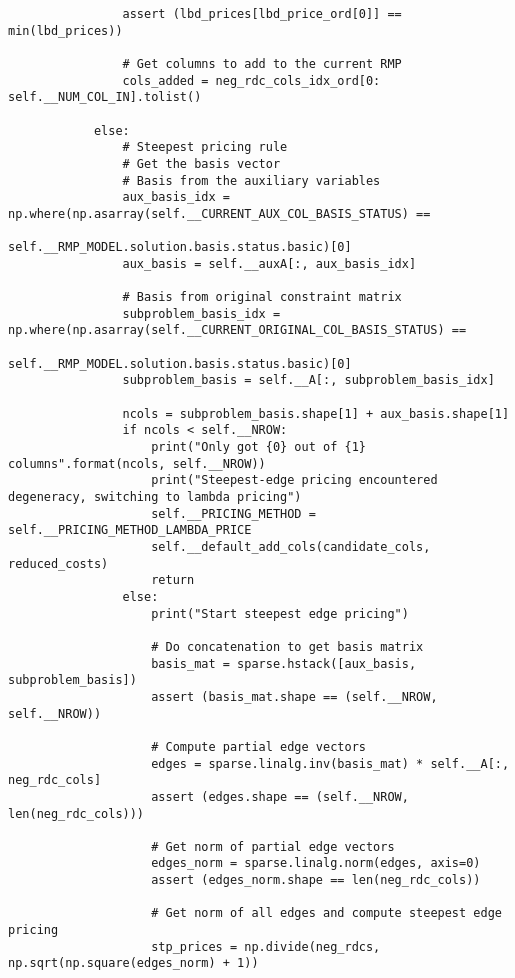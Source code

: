\documentclass{article}
\begin{document}
\begin{lstlisting}
                assert (lbd_prices[lbd_price_ord[0]] == min(lbd_prices))

                # Get columns to add to the current RMP
                cols_added = neg_rdc_cols_idx_ord[0: self.__NUM_COL_IN].tolist()

            else:
                # Steepest pricing rule
                # Get the basis vector
                # Basis from the auxiliary variables
                aux_basis_idx = np.where(np.asarray(self.__CURRENT_AUX_COL_BASIS_STATUS) ==
                                         self.__RMP_MODEL.solution.basis.status.basic)[0]
                aux_basis = self.__auxA[:, aux_basis_idx]

                # Basis from original constraint matrix
                subproblem_basis_idx = np.where(np.asarray(self.__CURRENT_ORIGINAL_COL_BASIS_STATUS) ==
                                                self.__RMP_MODEL.solution.basis.status.basic)[0]
                subproblem_basis = self.__A[:, subproblem_basis_idx]

                ncols = subproblem_basis.shape[1] + aux_basis.shape[1]
                if ncols < self.__NROW:
                    print("Only got {0} out of {1} columns".format(ncols, self.__NROW))
                    print("Steepest-edge pricing encountered degeneracy, switching to lambda pricing")
                    self.__PRICING_METHOD = self.__PRICING_METHOD_LAMBDA_PRICE
                    self.__default_add_cols(candidate_cols, reduced_costs)
                    return
                else:
                    print("Start steepest edge pricing")

                    # Do concatenation to get basis matrix
                    basis_mat = sparse.hstack([aux_basis, subproblem_basis])
                    assert (basis_mat.shape == (self.__NROW, self.__NROW))

                    # Compute partial edge vectors
                    edges = sparse.linalg.inv(basis_mat) * self.__A[:, neg_rdc_cols]
                    assert (edges.shape == (self.__NROW, len(neg_rdc_cols)))

                    # Get norm of partial edge vectors
                    edges_norm = sparse.linalg.norm(edges, axis=0)
                    assert (edges_norm.shape == len(neg_rdc_cols))

                    # Get norm of all edges and compute steepest edge pricing
                    stp_prices = np.divide(neg_rdcs, np.sqrt(np.square(edges_norm) + 1))


\end{lstlisting}
\end{document}
